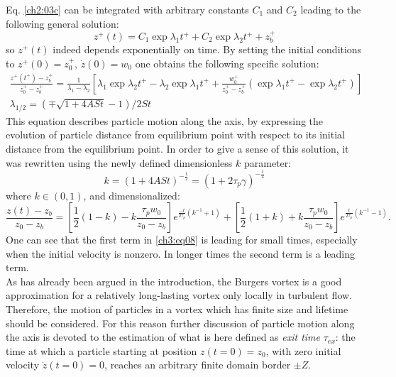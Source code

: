 \documentclass[../main.tex]{subfiles}
\begin{document}
Eq. \ref{ch2:03c} can be integrated with arbitrary constants $C_1$ and $C_2$ leading to the following general solution:
\begin{equation}
z^+(t)=C_1 \exp{\lambda_1 t^+}+C_2 \exp{\lambda_2 t^+}+z^+_b
\label{ch3:eq05}
\end{equation}
so $z^+(t)$ indeed depends exponentially on time.
By setting the initial conditions to $z^+(0)=z^+_0$, $\dot{z}(0)=w_0$ one obtains the following specific solution:
\begin{align}
\frac{z^+(t^+)-z^+_b}{z^+_0-z^+_b}=\frac{1}{\lambda_1-\lambda_2} \left[ \lambda_1 \exp{\lambda_2 t^+}-\lambda_2 \exp{\lambda_1 t^+} + \frac{w^+_0}{z^+_0-z^+_b}\left( \exp{\lambda_1 t^+}- \exp{\lambda_2 t^+}\right)\right] \\
\lambda_{1/2}=\left( \mp \sqrt{1+4 A St}-1\right)/2 St
\label{ch3:eq06}
\end{align}
This equation describes particle motion along the axis, by expressing the evolution of particle distance from equilibrium point with respect to its initial distance from the equilibrium point. In order to give a sense of this solution, it was rewritten using the newly defined dimensionless $k$ parameter:
\begin{equation}
k=(1+4 A St)^{-\frac{1}{2}}=(1+2\tau_p \gamma)^{-\frac{1}{2}}
\end{equation}
where $k \in (0,1)$, and dimensionalized:
\begin{equation}
\frac{z(t)-z_b}{z_0-z_b}=
\left[\frac{1}{2}\left(1-k\right)-k\frac{\tau_p w_0}{z_0-z_b}\right] e^{\frac{-t}{2 \tau_p}(k^{-1}+1)}+
\left[\frac{1}{2}\left(1+k\right)+k\frac{\tau_p w_0}{z_0-z_b} \right] e^{\frac{t}{2 \tau_p}(k^{-1}-1)}.
\label{ch3:eq08}
\end{equation}
One can see that the first term in \ref{ch3:eq08} is leading for small times, especially when the initial velocity is nonzero. In longer times the second term is a leading term.\\
As has already been argued in the introduction, the Burgers vortex is a good approximation for a relatively long-lasting vortex only locally in turbulent flow. Therefore, the motion of particles in a vortex which has finite size and lifetime should be considered. For this reason further discussion of particle motion along the axis is devoted to the estimation of what is here defined as \emph{exit time} $\tau_{ex}$: the time at which a particle starting at position $z(t=0)=z_0$, with zero initial velocity $\dot{z}(t=0)=0$, reaches an arbitrary finite domain border $\pm Z$.\\
\end{document}
